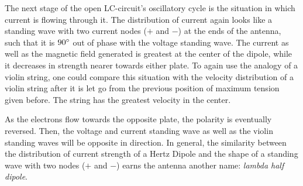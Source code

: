 The next stage of the open LC-circuit's oscillatory cycle is the situation in which current is flowing through it. The distribution of current again looks like a standing wave with two current nodes ($+$ and $-$) at the ends of the antenna, such that it is $90\degree$ out of phase with the voltage standing wave. The current as well as the magnetic field generated is greatest at the center of the dipole, while it decreases in strength nearer towards either plate. To again use the analogy of a violin string, one could compare this situation with the velocity distribution of a violin string after it is let go from the previous position of maximum tension given before. The string has the greatest velocity in the center. 

As the electrons flow towards the opposite plate, the polarity is eventually reversed. Then, the voltage and current standing wave as well as the violin standing waves will be opposite in direction. In general, the similarity between the distribution of current strength of a Hertz Dipole and the shape of a standing wave with two nodes ($+$ and $-$) earns the antenna another name: \emph{lambda half dipole}.

